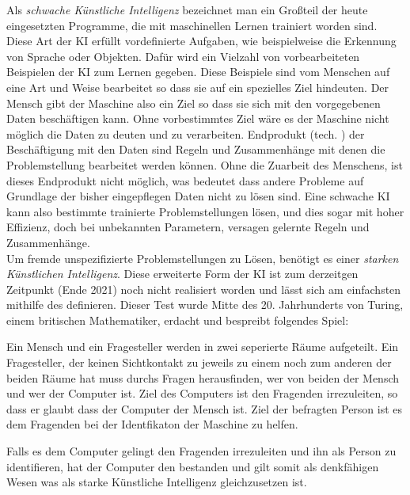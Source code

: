 \documentclass[12pt]{report}
\begin{document}
    Als \emph{schwache Künstliche Intelligenz} bezeichnet man ein Großteil der heute eingesetzten Programme, die mit
    maschinellen Lernen trainiert worden sind.\cite{ibm2021whatisAI} Diese Art der KI erfüllt vordefinierte Aufgaben,
    wie beispielweise die Erkennung von Sprache oder Objekten. Dafür wird ein Vielzahl von vorbearbeiteten Beispielen der KI
    zum Lernen gegeben. Diese Beispiele sind vom Menschen auf eine Art und Weise bearbeitet so dass sie auf ein spezielles Ziel hindeuten.
    Der Mensch gibt der Maschine also ein Ziel so dass sie sich mit den vorgegebenen Daten beschäftigen kann.
    Ohne vorbestimmtes Ziel wäre es der Maschine nicht möglich die Daten zu deuten und zu verarbeiten.
    Endprodukt (tech. ) der Beschäftigung mit den Daten sind Regeln und Zusammenhänge
    mit denen die Problemstellung bearbeitet werden können. Ohne die Zuarbeit des Menschens, ist dieses Endprodukt nicht
    möglich, was bedeutet dass andere Probleme auf Grundlage der bisher eingepflegen Daten nicht zu lösen sind.
    Eine schwache KI kann also bestimmte trainierte Problemstellungen lösen, und dies sogar mit hoher Effizienz, doch bei
    unbekannten Parametern, versagen gelernte Regeln und Zusammenhänge.\\

    Um fremde unspezifizierte Problemstellungen zu Lösen, benötigt es einer \emph{starken Künstlichen Intelligenz}.
    Diese erweiterte Form der KI ist zum derzeitgen Zeitpunkt (Ende 2021) noch nicht realisiert worden und lässt sich am
    einfachsten mithilfe des  definieren. Dieser Test wurde Mitte des 20. Jahrhunderts von
    Turing, einem britischen Mathematiker, erdacht und bespreibt folgendes Spiel:
    \begin{displayquote}
        Ein Mensch und ein Fragesteller werden in zwei seperierte
        Räume aufgeteilt. Ein Fragesteller, der keinen Sichtkontakt zu jeweils zu einem noch zum anderen der beiden Räume hat
        muss durchs Fragen herausfinden, wer von beiden der Mensch und wer der Computer ist.\cite{turing1950computing}
        Ziel des Computers ist den Fragenden irrezuleiten, so dass er glaubt dass der Computer der Mensch ist.
        Ziel der befragten Person ist es dem Fragenden bei der Identfikaton der Maschine zu helfen.\cite{turing1950computing}
    \end{displayquote}
    Falls es dem Computer gelingt den Fragenden irrezuleiten und ihn als Person zu identifieren, hat der Computer
    den  bestanden und gilt somit als denkfähigen Wesen was als starke Künstliche Intelligenz
    gleichzusetzen ist.\cite{oppy&dowe2020turingtest}
\end{document}
